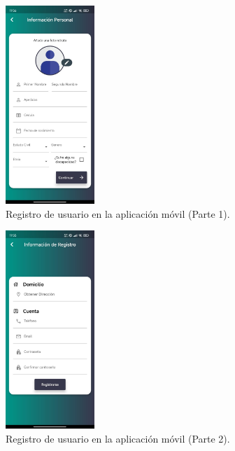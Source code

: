 \begin{figure}[H]
    \centering
    \includegraphics[width=0.3\textwidth]{chapters/III-resultados-y-discusion/resources/images/registro-usuario-movil-1.png}
    \caption{Registro de usuario en la aplicación móvil (Parte 1).}
    \label{fig:registro-usuario-movil-1}
\end{figure}

\begin{figure}[H]
    \centering
    \includegraphics[width=0.3\textwidth]{chapters/III-resultados-y-discusion/resources/images/registro-usuario-movil-2.png}
    \caption{Registro de usuario en la aplicación móvil (Parte 2).}
    \label{fig:registro-usuario-movil-2}
\end{figure}

